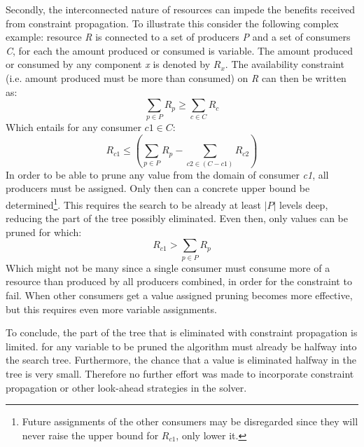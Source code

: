 Secondly, the interconnected nature of resources can impede the benefits received from constraint propagation. To illustrate this consider the following complex example: resource \emph{R} is connected to a set of producers \emph{P} and a set of consumers \emph{C}, for each the amount produced or consumed is variable. The amount produced or consumed by any component \emph{x} is denoted by $R_x$. The availability constraint (i.e. amount produced must be more than consumed) on \emph{R} can then be written as:
$$\sum_{p \in P}R_p \geq \sum_{c \in C}R_c$$
Which entails for any consumer $c1 \in C$: 
$$R_{c1} \leq \left(\sum_{p \in P} R_p - \sum_{c2 \in (C-c1)} R_{c2}\right)$$
In order to be able to prune any value from the domain of consumer \emph{c1}, all producers must be assigned. Only then can a concrete upper bound be determined\footnote{Future assignments of the other consumers may be disregarded since they will never raise the upper bound for $R_{c1}$, only lower it.}. This requires the search to be already at least $|P|$ levels deep, reducing the part of the tree possibly eliminated. Even then, only values can be pruned for which:
$$R_{c1} > \sum_{p \in P} R_p$$
Which might not be many since a single consumer must consume more of a resource than produced by all producers combined, in order for the constraint to fail. When other consumers get a value assigned pruning becomes more effective, but this requires even more variable assignments. 

To conclude, the part of the tree that is eliminated with constraint propagation is limited. for any variable to be pruned the algorithm must already be halfway into the search tree. Furthermore, the chance that a value is eliminated halfway in the tree is very small. Therefore no further effort was made to incorporate constraint propagation or other look-ahead strategies in the solver.



	









